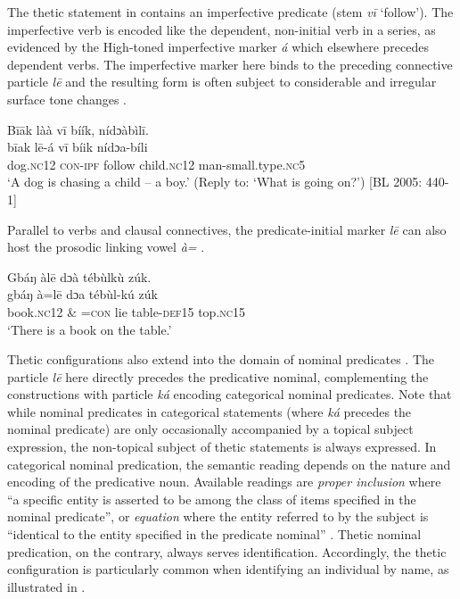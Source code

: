 \documentclass[output=paper]{langsci/langscibook}
\begin{document}
The thetic statement in  contains an imperfective predicate (stem \textit{v\={i} }‘follow’). The imperfective verb is encoded like the dependent, non-initial verb in a series, as evidenced by the High-toned imperfective marker \textit{á} which elsewhere precedes dependent verbs. The imperfective marker here binds to the preceding connective particle \textit{l\={e} }and the resulting form is often subject to considerable and irregular surface tone changes \citep{Schwarz2007}.

\ea
\glll \textup{}  B\={i}\={a}k    làà    v\={i}  bíík,    nídɔàbìl\={i}.\\
  \textup{  b\={i}ak    l\={e}-á    v\={i}  bíik    nídɔa-bíli}\\
       dog.\textsc{nc}12  \textsc{con}{}-\textsc{ipf}  follow  child.\textsc{nc}12  man-small.type.\textsc{nc}5\\
\glt ‘A dog is chasing a child – a boy.’ (Reply to: ‘What is going on?’) [BL  2005: 440-1]
\z

Parallel to verbs and clausal connectives, the predicate-initial marker \textit{l\={e} }can also host the prosodic linking vowel \textit{à}\textit{=} .

\ea
\glll \textup{}  Gbáŋ    àl\={e}    dɔà  tébùlkù    zúk.\\
  \textup{  gbáŋ    à=l\={e}    dɔa  tébùl-kú  zúk}\\
       book.\textsc{nc}12   \& =\textsc{con}  lie  table-\textsc{def}15  top.\textsc{nc}15\\
\glt ‘There is a book on the table.’ \citep[271]{Schwarz2009}
\z

Thetic configurations also extend into the domain of nominal predicates . The particle \textit{l\={e} }here directly precedes the predicative nominal, complementing the constructions with particle \textit{ká }encoding categorical nominal predicates. Note that while nominal predicates in categorical statements (where \textit{ká }precedes the nominal predicate) are only occasionally accompanied by a topical subject expression, the non-topical subject of thetic statements is always expressed. In categorical nominal predication, the semantic reading depends on the nature and encoding of the predicative noun. Available readings are \textit{proper inclusion} where “a specific entity is asserted to be among the class of items specified in the nominal predicate”, or \textit{equation} where the entity referred to by the subject is “identical to the entity specified in the predicate nominal” \citep[114]{Payne1997}. Thetic nominal predication, on the contrary, always serves identification. Accordingly, the thetic configuration is particularly common when identifying an individual by name, as illustrated in .
\end{document}
